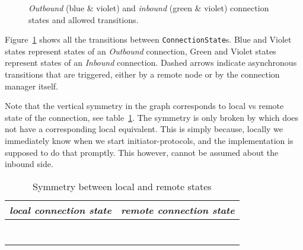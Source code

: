 \begin{figure}[p]
{}
  \caption{\textit{Outbound} (blue \& violet) and \textit{inbound} (green \&
  violet) connection states and allowed transitions.}
  \label{fig:statediagram}
\end{figure}

Figure~\ref{fig:statediagram} shows all the transitions between
\texttt{ConnectionState}s. Blue and Violet states represent states of
an \textit{Outbound} connection, Green and Violet states represent states of an
\textit{Inbound} connection. Dashed arrows indicate asynchronous
transitions that are triggered, either by a remote node or by the connection
manager itself.

Note that the vertical symmetry in the graph corresponds to local vs remote
state of the connection, see table~\ref{table:symmetry}. The symmetry is only
broken by \InboundIdleStateAny{} which does not have a corresponding
local equivalent. This is simply because, locally we immediately know when we
start initiator-protocols, and the implementation is supposed to do that
promptly. This however, cannot be assumed about the inbound side.

\begin{table}[h]
  \begin{tabular}[h]{l|l}
    \textit{local connection state} & \textit{remote connection state} \\ [0.3em]
    \hline \\
    \UnnegotiatedStateOut{}         & \UnnegotiatedStateIn{}           \\ [0.2em]
    \OutboundIdleStateAny{}         & \InboundIdleStateAny{}           \\ [0.2em]
    \OutboundStateAny{}             & \InboundStateAny{}               \\ [0.2em]
    \OutboundStateAnyTau{}          & \InboundStateAny{}               \\ [0.2em]
    \InboundStateAny{}              & \OutboundStateAny{}              \\ [0.2em]
    \DuplexState{}                  & \DuplexState{}                   \\ [0.2em]
  \end{tabular}
  \caption{Symmetry between local and remote states}
  \label{table:symmetry}
\end{table}

